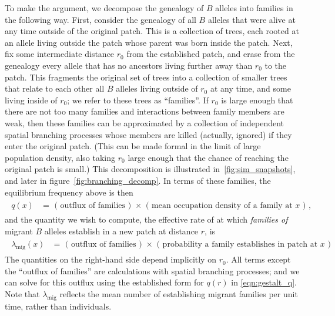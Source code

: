 \documentclass{article}
\newcommand{\migrate}{\lambda_\text{mig}}
\begin{document}
To make the argument, we decompose the genealogy of $B$ alleles into families in the following way.
First, consider the genealogy of all $B$ alleles that were alive at any time outside of the original patch.  
This is a collection of trees, each rooted at an allele living outside the patch whose parent was born inside the patch.
Next, fix some intermediate distance $r_0$ from the established patch,
and erase from the genealogy every allele that has no ancestors living further away than $r_0$ to the patch.
This fragments the original set of trees into a collection of smaller trees that relate to each other all $B$ alleles living outside of $r_0$ at any time,
and some living inside of $r_0$;
we refer to these trees as ``families''.
If $r_0$ is large enough that there are not too many families
and interactions between family members are weak,
then these families can be approximated by a collection of independent spatial branching processes
whose members are killed (actually, ignored) if they enter the original patch.
(This can be made formal in the limit of large population density, also taking $r_0$ large enough that the chance of reaching the original patch is small.)
This decomposition is illustrated in~\ref{fig:sim_snapshots}, and later in figure~\ref{fig:branching_decomp}.
In terms of these families, the equilibrium frequency above is then
\begin{align}
    \label{eqn:gestalt_q}
    \begin{split}
        q(x) &= \text{ ( outflux of families ) } \times \text{ ( mean occupation density of a family at $x$ ) } ,
\end{split}
\end{align}
and the quantity we wish to compute,
the effective rate of at which \emph{families of} migrant $B$ alleles establish in a new patch at distance $r$, 
is
\begin{align}
    \label{eqn:gestalt_migrate}
    \begin{split}
        \migrate(x) &= \text{ ( outflux of families ) } \times \text{ ( probability a family establishes in patch at $x$ ) }
    \end{split}
\end{align}
The quantities on the right-hand side depend implicitly on $r_0$.
All terms except the ``outflux of families'' are calculations with spatial branching processes;
and we can solve for this outflux using the established form for $q(r)$ in \eqref{eqn:gestalt_q}.
Note that $\migrate$ reflects the mean number of establishing migrant families per unit time,  rather than individuals.
\end{document}
